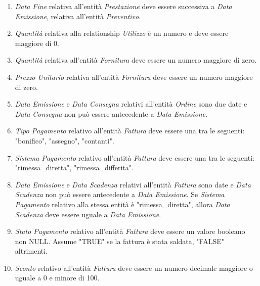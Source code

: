 \begin{enumerate}
				\item \emph{Data Fine} relativa all'entità \emph{Prestazione} deve essere successiva a \emph{Data Emissione}, relativa all'entità \emph{Preventivo}.
				
				\item \emph{Quantità} relativa alla relationship \emph{Utilizzo} è un numero e deve essere maggiore di 0.
				
				\item \emph{Quantità} relativa all'entità \emph{Fornitura} deve essere un numero maggiore di zero.
				\item \emph{Prezzo Unitario} relativa all'entità \emph{Fornitura} deve essere un numero maggiore di zero.
				
				\item \emph{Data Emissione} e \emph{Data Consegna} relativi all'entità \emph{Ordine} sono due date e \emph{Data Consegna} non può essere antecedente a \emph{Data Emissione}.
				
				\item \emph{Tipo Pagamento} relativo all'entità \emph{Fattura} deve essere una tra le seguenti: "bonifico", "assegno", "contanti".
				\item \emph{Sistema Pagamento} relativo all'entità \emph{Fattura} deve essere una tra le seguenti: "rimessa\_diretta", "rimessa\_differita".
				\item \emph{Data Emissione} e \emph{Data Scadenza} relativi all'entità \emph{Fattura} sono date e \emph{Data Scadenza} non può essere antecedente a \emph{Data Emissione}. Se \emph{Sistema Pagamento} relativo alla stessa entità è "rimessa\_diretta", allora \emph{Data Scadenza} deve essere uguale a \emph{Data Emissione}.
				\item \emph{Stato Pagamento} relativo all’entità \emph{Fattura} deve essere un valore booleano non NULL. Assume "TRUE" se la fattura è stata saldata, "FALSE" altrimenti.
				\item \label{rv:sconto} \emph{Sconto} relativo all'entità \emph{Fattura} deve essere un numero decimale maggiore o uguale a 0 e minore di 100.
				

\end{enumerate}
